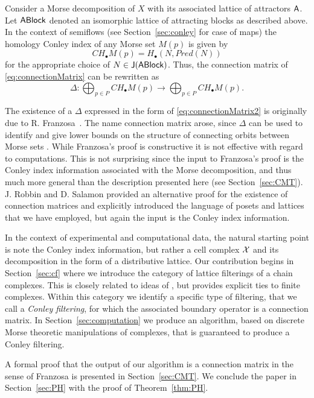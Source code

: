 Consider a Morse decomposition of $X$ with its associated lattice of attractors ${\mathsf A}$.
Let  ${\mathsf{ ABlock}}$ denoted an isomorphic lattice of attracting blocks as described above.
In the context of semiflows (see Section~\ref{sec:conley} for case of maps)  the homology Conley index of any Morse set $M(p)$ is given by 
\[
CH_\bullet M(p) = H_\bullet (N, Pred(N))
\]
for the appropriate choice of $N\in {\mathsf J}({\mathsf{ ABlock}})$.
Thus, the connection matrix of \eqref{eq:connectionMatrix} can be rewritten as
\begin{equation}
\label{eq:connectionMatrix2}
\Delta \colon \bigoplus_{p\in P} CH_\bullet M(p) \to \bigoplus_{p\in P} CH_\bullet M(p).
\end{equation}

The existence of a $\Delta$ expressed in the form of \eqref{eq:connectionMatrix2} is originally due to R. Franzosa~\cite{fran}.
The name connection matrix arose, since $\Delta$ can be used to identify and give lower bounds on the structure of connecting orbits between Morse sets \cite{scalar,mischaikow,mcmodels}.
While Franzosa's proof is constructive it is not effective with regard to computations. 
This is not surprising since the input to Franzosa's proof is the Conley index information associated with the Morse decomposition, and thus much more general than the description presented here (see Section~\ref{sec:CMT}).
J. Robbin and D. Salamon \cite{robbin:salamon2} provided an alternative proof for the existence of connection matrices and explicitly introduced the language of posets and lattices that we have employed, but again the input is the Conley index information.

In the context of experimental and computational data, the natural starting point is note the Conley index information, but rather a cell complex ${\mathcal X}$ and its decomposition in the form of a distributive lattice.
Our contribution begins in Section~\ref{sec:cf} where we introduce the category of lattice filterings of a chain complexes.
This is closely related to ideas of \cite{robbin:salamon2}, but provides explicit ties to finite complexes.
Within this category we identify a specific type of filtering, that we call a \emph{Conley filtering}, for which the associated boundary operator is a connection matrix.
In Section~\ref{sec:computation} we produce an algorithm, based on discrete Morse theoretic manipulations of complexes, that is guaranteed to produce a Conley filtering.

A formal proof that the output of our algorithm is a connection matrix in the sense of Franzosa is presented in Section~\ref{sec:CMT}.
We conclude the paper in Section~\ref{sec:PH} with the proof of Theorem~\ref{thm:PH}.

